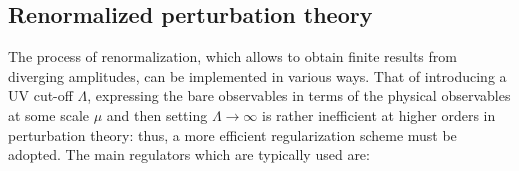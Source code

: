 
\subsection{Renormalized perturbation theory}

The process of renormalization, which allows to obtain finite results from diverging amplitudes, can be implemented in various ways. That of introducing a UV cut-off $ \Lambda $, expressing the bare observables in terms of the physical observables at some scale $ \mu $ and then setting $ \Lambda \rightarrow \infty $ is rather inefficient at higher orders in perturbation theory: thus, a more efficient regularization scheme must be adopted. The main regulators which are typically used are:
